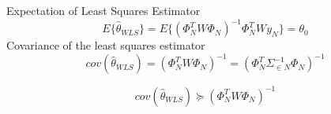 \begin{tcolorbox}[colback=red!5!white,colframe=red!75!black,title=Statistical Analysis of WLS]
Expectation of Least Squares Estimator
\begin{equation*}
{ E }\{ { \hat { \theta  } _{ WLS } }\} { ={ E }\{ ({ \Phi  }_{ N }^{ T }W{ \Phi  }_{ N }) }^{ -1 }{ \Phi  }_{ N }^{ T }W{ y }_{ N }\} ={\theta}_{0}
\end{equation*}
Covariance of the least squares estimator
\begin{equation*}
cov({ \hat { \theta  } _{ WLS } }){ =({ \Phi  }_{ N }^{ T }W{ \Phi  }_{ N }) }^{ -1 }{ =({ \Phi  }_{ N }^{ T }{\Sigma}_{\in N }^{ -1 }{ \Phi  }_{ N }) }^{ -1 }
\end{equation*}

\begin{equation*}
cov({ \hat { \theta  } _{ WLS } }){ \succeq ({ \Phi  }_{ N }^{ T }W{ \Phi  }_{ N }) }^{ -1 }
\end{equation*}
\end{tcolorbox}

